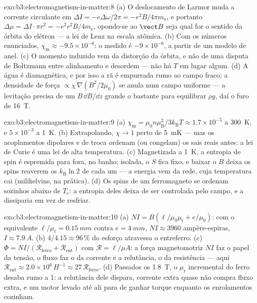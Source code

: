 \begin{solution}{exo:b3:electromagnetism-in-matter:8}
(a) O deslocamento de Larmor muda a corrente circulante em $\Delta I
= -e\Delta\omega/2\pi = -e^2B/4\pi m_{\text{e}}$, e portanto
$\Delta\mu = \Delta I\cdot\pi r^2 = -e^2r^2B/4m_{\text{e}}$,
opondo-se ao $\vect B$ seja qual for o sentido da órbita do elétron ---
a lei de Lenz na escala atômica. (b) Com os números enunciados,
$\chi_{\text{m}} \approx -9.5\times10^{-6}$: o medido é
$-9\times10^{-6}$, a partir de um modelo de anel. (c) O momento induzido
vem da distorção da órbita, e não de uma disputa de Boltzmann
entre alinhamento e desordem --- não há $T$ em lugar algum. (d) A água é
diamagnética, e por isso a rã é empurrada rumo ao campo fraco; a
densidade de força $\propto \chi\,\nabla(B^2/2\mu_0)$ se anula num campo
uniforme --- a levitação precisa de um $B\,\dd B/\dd z$ grande o bastante
para equilibrar $\rho g$, daí o furo de \qty{16}{T}.
\end{solution}

\begin{solution}{exo:b3:electromagnetism-in-matter:9}
(a) $\chi_{\text{m}} = \mu_0n\mu_{\text{B}}^2/3k_{\text{B}}T
\approx 1.7\times10^{-5}$ a \qty{300}{K}, e $5\times10^{-3}$ a
\qty{1}{K}. (b) Extrapolando, $\chi \to 1$ perto de \qty{5}{mK} ---
mas os acoplamentos dipolares e de troca ordenam (ou congelam) os sais
reais antes: a lei de Curie é uma lei de alta temperatura. (c) Magnetizada
a \qty{1}{K}, a entropia de spin é espremida para fora, no banho;
isolada, o $S$ fica fixo, e baixar o $B$ deixa os spins reaverem
os $k_{\text{B}}\ln 2$ de cada um --- a energia vem da
rede, cuja temperatura cai (milikelvins, na prática). (d)
Os spins de um ferromagneto se ordenam sozinhos abaixo de $T_{\text{c}}$: a
entropia deles deixa de ser controlada pelo campo, e a 
dissiparia em vez de resfriar.
\end{solution}

\begin{solution}{exo:b3:electromagnetism-in-matter:10}
(a) $NI = B(\ell/\mu_0\mu_{\text{r}} + e/\mu_0)$: com o equivalente
$\ell/\mu_{\text{r}} = \qty{0.15}{mm}$ contra $e =
\qty{4}{mm}$, $NI \approx 3960$ ampère-espiras, $I \approx
\qty{7.9}{A}$. (b) $4/4.15 \approx 96\,\%$ do esforço atravessa
o entreferro. (c) $\Phi = NI/(\mathcal R_{\text{ferro}} +
\mathcal R_{\text{ent}})$ com $\mathcal R = \ell/\mu A$:
a força magnetomotriz $NI$ faz o papel da tensão, o fluxo faz o da
corrente e a relutância, o da resistência --- aqui $\mathcal R_{\text{ent}}
\approx 2.0\times10^{6}\,\unit{H^{-1}} \approx
27\,\mathcal R_{\text{ferro}}$. (d) Passados os \qty{1.8}{T}, o
$\mu_{\text{r}}$ incremental do ferro desaba rumo a 1: a relutância
dele dispara, corrente extra quase não compra fluxo extra, e um motor
levado até ali para de ganhar torque enquanto os enrolamentos cozinham.
\end{solution}

